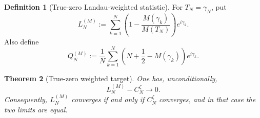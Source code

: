 \documentclass[11pt]{amsart}
\numberwithin{equation}{section}
\newtheorem{theorem}{Theorem}[section]
\theoremstyle{definition}
\newtheorem{definition}[theorem]{Definition}
\theoremstyle{remark}
\begin{document}
\begin{definition}[True-zero Landau-weighted statistic]\label{def:true_zero_landau}
For $T_N=\gamma_N$, put
\begin{equation}\label{eq:true_zero_landau}
L_N^{(M)}
:=\sum_{k=1}^{N}
\left(1-\frac{M(\gamma_k)}{M(T_N)}\right)e^{i\gamma_k}.
\end{equation}
Also define
\begin{equation}\label{eq:QM_definition}
Q_N^{(M)}
:=\frac1N\sum_{k=1}^{N}
\left(N+\frac12-M(\gamma_k)\right)e^{i\gamma_k}.
\end{equation}
\end{definition}

\begin{theorem}[True-zero weighted target]\label{thm:truezerolandau}
One has, unconditionally,
\begin{equation}\label{eq:true_zero_landau_equivalence}
L_N^{(M)}-C_N^{\zeta}\longrightarrow0.
\end{equation}
Consequently, $L_N^{(M)}$ converges if and only if $C_N^{\zeta}$ converges, and in that case the two limits are equal.
\end{theorem}
\end{document}
